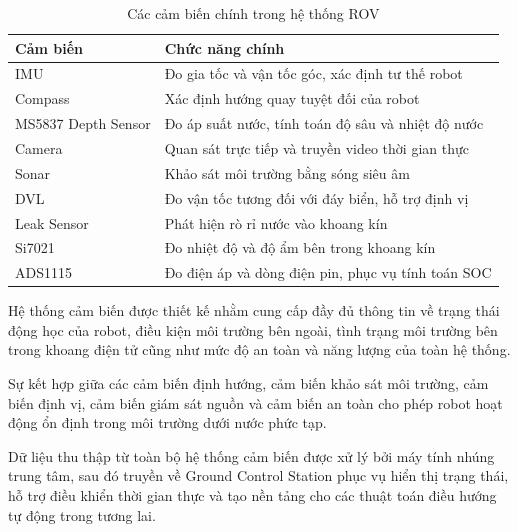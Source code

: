 \documentclass[../DoAn.tex]{subfiles}
\begin{document}
\begin{table}[H]
\centering
\caption{Các cảm biến chính trong hệ thống ROV}
\label{tab:sensor_system}
\begin{tabular}{|p{4cm}|p{9cm}|}
\hline
\textbf{Cảm biến} & \textbf{Chức năng chính} \\ \hline

IMU &
Đo gia tốc và vận tốc góc, xác định tư thế robot \\ \hline

Compass &
Xác định hướng quay tuyệt đối của robot \\ \hline

MS5837 Depth Sensor &
Đo áp suất nước, tính toán độ sâu và nhiệt độ nước \\ \hline

Camera &
Quan sát trực tiếp và truyền video thời gian thực \\ \hline

Sonar &
Khảo sát môi trường bằng sóng siêu âm \\ \hline

DVL &
Đo vận tốc tương đối với đáy biển, hỗ trợ định vị \\ \hline

Leak Sensor &
Phát hiện rò rỉ nước vào khoang kín \\ \hline

Si7021 &
Đo nhiệt độ và độ ẩm bên trong khoang kín \\ \hline

ADS1115 &
Đo điện áp và dòng điện pin, phục vụ tính toán SOC \\ \hline

\end{tabular}
\end{table}

Hệ thống cảm biến được thiết kế nhằm cung cấp đầy đủ thông tin về trạng thái động học của robot, điều kiện môi trường bên ngoài, tình trạng môi trường bên trong khoang điện tử cũng như mức độ an toàn và năng lượng của toàn hệ thống.

Sự kết hợp giữa các cảm biến định hướng, cảm biến khảo sát môi trường, cảm biến định vị, cảm biến giám sát nguồn và cảm biến an toàn cho phép robot hoạt động ổn định trong môi trường dưới nước phức tạp.

Dữ liệu thu thập từ toàn bộ hệ thống cảm biến được xử lý bởi máy tính nhúng trung tâm, sau đó truyền về Ground Control Station phục vụ hiển thị trạng thái, hỗ trợ điều khiển thời gian thực và tạo nền tảng cho các thuật toán điều hướng tự động trong tương lai.
\end{document}
